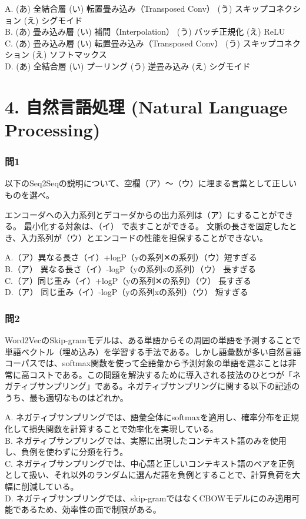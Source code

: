\documentclass[
  letterpaper,
  DIV=11,
  numbers=noendperiod]{scrreprt}
\begin{document}
A. (あ) 全結合層 (い) 転置畳み込み（Transposed Conv） (う)
スキップコネクション (え) シグモイド\\
B. (あ) 畳み込み層 (い) 補間（Interpolation） (う) バッチ正規化 (え)
ReLU\\
C. (あ) 畳み込み層 (い) 転置畳み込み（Transposed Conv） (う)
スキップコネクション (え) ソフトマックス\\
D. (あ) 全結合層 (い) プーリング (う) 逆畳み込み (え) シグモイド

\chapter{4. 自然言語処理 (Natural Language
Processing)}\label{ux81eaux7136ux8a00ux8a9eux51e6ux7406-natural-language-processing}

\subsection{問1}\label{ux554f1-5}

以下のSeq2Seqの説明について、空欄（ア）～（ウ）に埋まる言葉として正しいものを選べ。

エンコーダへの入力系列とデコーダからの出力系列は（ア）にすることができる。
最小化する対象は、（イ） で表すことができる。
文脈の長さを固定したとき、入力系列が（ウ）とエンコードの性能を担保することができない。

A.（ア）異なる長さ（イ）+logP（yの系列\textbar✕の系列）（ウ）短すぎる\\
B.（ア） 異なる長さ（イ）-logP（yの系列\textbar xの系列）（ウ）
長すぎる\\
C.（ア）同じ重み（イ）+logP（yの系列\textbar✕の系列）（ウ） 長すぎる\\
D.（ア） 同じ重み（イ）-logP（yの系列xの系列）（ウ） 短すぎる

\subsection{問2}\label{ux554f2-3}

Word2VecのSkip-gramモデルは、ある単語からその周囲の単語を予測することで単語ベクトル（埋め込み）を学習する手法である。しかし語彙数が多い自然言語コーパスでは、softmax関数を使って全語彙から予測対象の単語を選ぶことは非常に高コストである。この問題を解決するために導入される技法のひとつが「ネガティブサンプリング」である。ネガティブサンプリングに関する以下の記述のうち、最も適切なものはどれか。

A.
ネガティブサンプリングでは、語彙全体にsoftmaxを適用し、確率分布を正規化して損失関数を計算することで効率化を実現している。\\
B.
ネガティブサンプリングでは、実際に出現したコンテキスト語のみを使用し、負例を使わずに分類を行う。\\
C.
ネガティブサンプリングでは、中心語と正しいコンテキスト語のペアを正例として扱い、それ以外のランダムに選んだ語を負例とすることで、計算負荷を大幅に削減している。\\
D.
ネガティブサンプリングでは、skip-gramではなくCBOWモデルにのみ適用可能であるため、効率性の面で制限がある。
\end{document}
